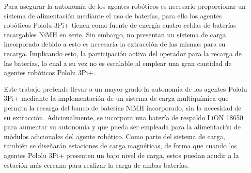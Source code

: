  Para asegurar la autonomía de los agentes robóticos es necesario proporcionar un sistema
de alimentación mediante el uso de baterías, para ello los agentes robóticos Pololu 3Pi+
 tienen como fuente de energía cuatro celdas de 
 baterías recargables NiMH en serie. Sin embargo, no presentan un sistema de
 carga incorporado debido a esto es necesaria la extracción de las mismas para 
 su recarga. Implicando esto, la participación activa del operador
 para la recarga de las baterías, lo cual a su vez no es escalable  al emplear una gran cantidad de
 agentes robóticos Pololu 3Pi+.

Este trabajo pretende llevar a un mayor grado la autonomía de los agentes Pololu 3Pi+ mediante
la implementación de un sistema de carga multiquímica que permita la recarga del banco de baterías
NiMH incorporado, sin la necesidad de su extracción. Adicionalmente, se incorpora una batería de 
respaldo LiON 18650 para aumentar su autonomía y que pueda ser empleada para la alimentación de módulos
adicionales del agente robótico. Como parte del sistema de carga, también se diseñarán estaciones de carga
magnéticas, de forma que cuando los agentes Pololu 3Pi+ presenten un bajo nivel de carga, estos puedan acudir 
a la estación más cercana para realizar la carga de ambas baterías. 

